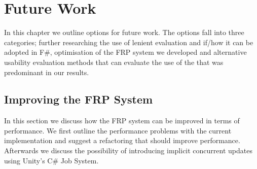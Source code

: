 \chapter{Future Work}
In this chapter we outline options for future work. The options fall into three categories; further researching the use of lenient evaluation and if/how it can be adopted in F\#, optimisation of the \gls{FRP} system we developed and alternative usability evaluation methods that can evaluate the use of the  that was predominant in our results.


\section{Improving the \gls{FRP} System}
In this section we discuss how the \gls{FRP} system can be improved in terms of performance. We first outline the performance problems with the current implementation and suggest a refactoring that should improve performance. Afterwards we discuss the possibility of introducing implicit concurrent updates using Unity's C\# Job System.



